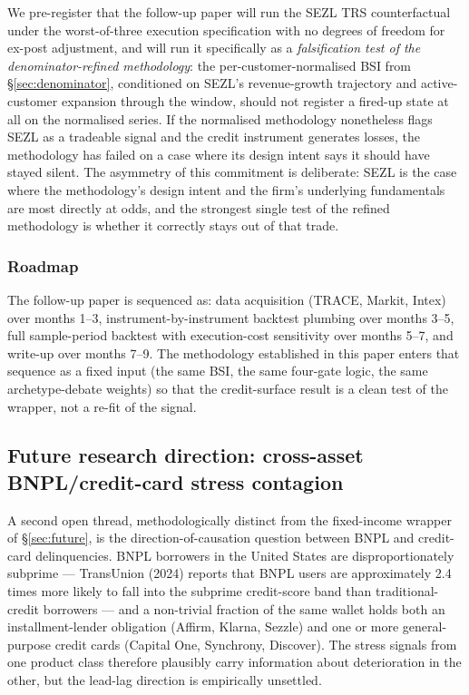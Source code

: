 \documentclass[11pt,a4paper]{article}
\begin{document}
We pre-register that the follow-up paper will run the SEZL TRS counterfactual under the worst-of-three execution specification with no degrees of freedom for ex-post adjustment, and will run it specifically as a \emph{falsification test of the denominator-refined methodology}: the per-customer-normalised BSI from §\ref{sec:denominator}, conditioned on SEZL's revenue-growth trajectory and active-customer expansion through the window, should not register a fired-up state at all on the normalised series. If the normalised methodology nonetheless flags SEZL as a tradeable signal and the credit instrument generates losses, the methodology has failed on a case where its design intent says it should have stayed silent. The asymmetry of this commitment is deliberate: SEZL is the case where the methodology's design intent and the firm's underlying fundamentals are most directly at odds, and the strongest single test of the refined methodology is whether it correctly stays out of that trade.

\subsubsection{Roadmap}

The follow-up paper is sequenced as: data acquisition (TRACE, Markit, Intex) over months 1--3, instrument-by-instrument backtest plumbing over months 3--5, full sample-period backtest with execution-cost sensitivity over months 5--7, and write-up over months 7--9. The methodology established in this paper enters that sequence as a fixed input (the same BSI, the same four-gate logic, the same archetype-debate weights) so that the credit-surface result is a clean test of the wrapper, not a re-fit of the signal.

\subsection{Future research direction: cross-asset BNPL/credit-card stress contagion}\label{sec:future_contagion}

A second open thread, methodologically distinct from the fixed-income wrapper of §\ref{sec:future}, is the direction-of-causation question between BNPL and credit-card delinquencies. BNPL borrowers in the United States are disproportionately subprime --- TransUnion (2024) reports that BNPL users are approximately 2.4 times more likely to fall into the subprime credit-score band than traditional-credit borrowers --- and a non-trivial fraction of the same wallet holds both an installment-lender obligation (Affirm, Klarna, Sezzle) and one or more general-purpose credit cards (Capital One, Synchrony, Discover). The stress signals from one product class therefore plausibly carry information about deterioration in the other, but the lead-lag direction is empirically unsettled.
\end{document}
